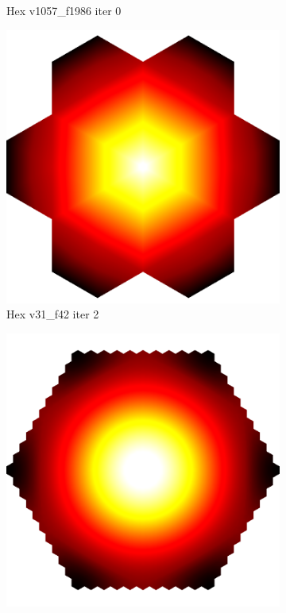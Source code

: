 \begin{figure}[ht]
{\begin{subfigure}[b]{0.48\linewidth}
		\caption{Hex v1057\_f1986 iter 0}\label{fig:hex.d}
	\end{subfigure}

	\bigskip
	\begin{subfigure}[b]{0.48\linewidth}
		\includegraphics[width=1.0\linewidth,height=0.3\textheight,keepaspectratio]{data/synthetic_meshes/hexagonal_tessellation_Dirac_delta_1_v31_f42_funcvals_2iter_crop.png}
		\caption{Hex v31\_f42 iter 2}\label{fig:hex.e}
	\end{subfigure}
	\begin{subfigure}[b]{0.48\linewidth}
		\includegraphics[width=1.0\linewidth,height=0.3\textheight,keepaspectratio]{data/synthetic_meshes/hexagonal_tessellation_Dirac_delta_10_v1057_f1986_funcvals_200iter_crop.png}

\end{subfigure}}
\end{figure}
